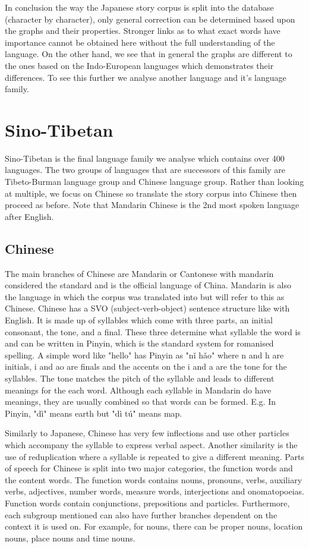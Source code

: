In conclusion the way the Japanese story corpus is split into the database (character by character), only general correction can be determined based upon the graphs and their properties. Stronger links as to what exact words have importance cannot be obtained here without the full understanding of the language. On the other hand, we see that in general the graphs are different to the ones based on the Indo-European languages which demonstrates their differences. To see this further we analyse another language and it's language family.

\section{Sino-Tibetan}
Sino-Tibetan is the final language family we analyse which contains over 400 languages. The two groups of languages that are successors of this family are Tibeto-Burman language group and Chinese language group. Rather than looking at multiple, we focus on Chinese so translate the story corpus into Chinese then proceed as before. Note that Mandarin Chinese is the 2nd most spoken language after English.

\subsection{Chinese}
The main branches of Chinese are Mandarin or Cantonese with mandarin considered the standard and is the official language of China. Mandarin is also the language in which the corpus was translated into but will refer to this as Chinese. Chinese has a SVO (subject-verb-object) sentence structure like with English. It is made up of syllables\cite{ross2017modern} which come with three parts, an initial consonant, the tone, and a final. These three determine what syllable the word is and can be written in Pinyin, which is the standard system for romanised spelling. A simple word like "hello" has Pinyin as "nǐ hǎo" where n and h are initials, i and ao are finals and the accents on the i and a are the tone for the syllables. The tone matches the pitch of the syllable and leads to different meanings for the each word. Although each syllable in Mandarin do have meanings, they are usually combined so that words can be formed. E.g. In Pinyin, "dì" means earth but "dì tú" means map.

Similarly to Japanese, Chinese has very few inflections and use other particles which accompany the syllable to express verbal aspect. Another similarity is the use of reduplication where a syllable is repeated to give a different meaning. Parts of speech for Chinese is split into two major categories, the function words and the content words. The function words contains nouns, pronouns, verbs, auxiliary verbs, adjectives, number words, measure words, interjections and onomatopoeias. Function words contain conjunctions, prepositions and particles. Furthermore, each subgroup mentioned can also have further branches dependent on the context it is used on. For example, for nouns, there can be proper nouns, location nouns, place nouns and time nouns.

